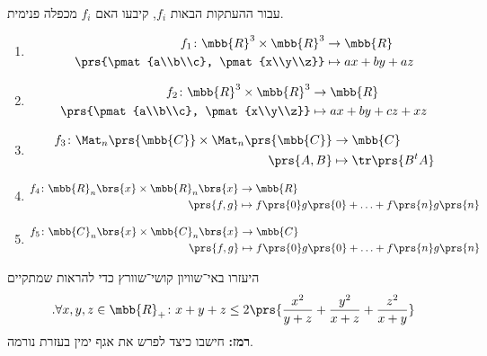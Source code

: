 \documentclass[a4paper,10pt,twoside,openany]{article}
\begin{document}
\begin{exercise}
עבור ההעתקות הבאות $f_i$, קיבעו האם $f_i$ מכפלה פנימית.

\begin{enumerate}
\item
\begin{align*}
f_1 \colon \mbb{R}^3 \times \mbb{R}^3 &\to \mbb{R} \\
\prs{\pmat{a\\b\\c}, \pmat{x\\y\\z}} &\mapsto ax + by + az
\end{align*}

\item
\begin{align*}
f_2 \colon \mbb{R}^3 \times \mbb{R}^3 &\to \mbb{R} \\
\prs{\pmat{a\\b\\c}, \pmat{x\\y\\z}} &\mapsto ax + by + cz + xz
\end{align*}

\item
\begin{align*}
f_3 \colon \Mat_n\prs{\mbb{C}} \times \Mat_n\prs{\mbb{C}} &\to \mbb{C} \\
\prs{A,B} &\mapsto \tr\prs{B^t A}
\end{align*}

\item
\begin{align*}
f_4 \colon \mbb{R}_n\brs{x} \times \mbb{R}_n\brs{x} &\to \mbb{R} \\
\prs{f,g} &\mapsto f\prs{0} g\prs{0} + \ldots + f\prs{n} g\prs{n}
\end{align*}

\item
\begin{align*}
f_5 \colon \mbb{C}_n\brs{x} \times \mbb{C}_n\brs{x} &\to \mbb{C} \\
\prs{f,g} &\mapsto f\prs{0} g\prs{0} + \ldots + f\prs{n} g\prs{n}
\end{align*}
\end{enumerate}
\end{exercise}

\begin{exercise}
היעזרו באי־שוויון קושי־שוורץ כדי להראות שמתקיים
\[\text{.} \forall x,y,z \in \mbb{R}_+ \colon x + y + z \leq 2 \prs{\frac{x^2}{y+z} + \frac{y^2}{x+z} + \frac{z^2}{x+y}}\]
\textbf{רמז:}
חישבו כיצד לפרש את אגף ימין בעזרת נורמה.
\end{exercise}
\end{document}
